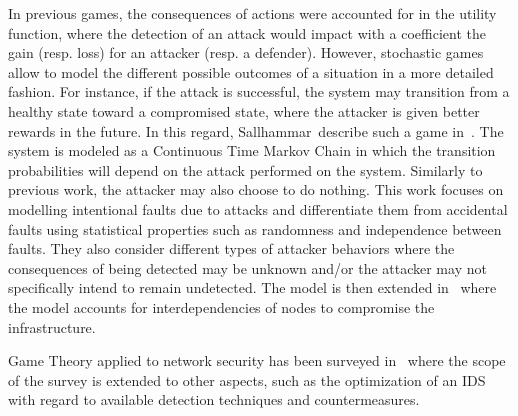 In previous games, the consequences of actions were accounted for in the utility function, where the detection of an attack would impact with a coefficient the gain (resp. loss) for an attacker (resp. a defender).
However, stochastic games allow to model the different possible outcomes of a situation in a more detailed fashion.
For instance, if the attack is successful, the system may transition from a healthy state toward a compromised state, where the attacker is given better rewards in the future.
In this regard, Sallhammar~\etal describe such a game in~\cite{sallhammar2005}.
The system is modeled as a Continuous Time Markov Chain in which the transition probabilities will depend on the attack performed on the system. Similarly to previous work, the attacker may also choose to do nothing.
This work focuses on modelling intentional faults due to attacks and differentiate them from accidental faults using statistical properties such as randomness and independence between faults.
They also consider different types of attacker behaviors where the consequences of being detected may be unknown and/or the attacker may not specifically intend to remain undetected.
The model is then extended in~\cite{Nguyen2009} where the model accounts for interdependencies of nodes to compromise the infrastructure.

Game Theory applied to network security has been surveyed in~\cite{Roy2010,Kiennert2018} where the scope of the survey is extended to other aspects, such as the optimization of an IDS with regard to available detection techniques and countermeasures.
 

